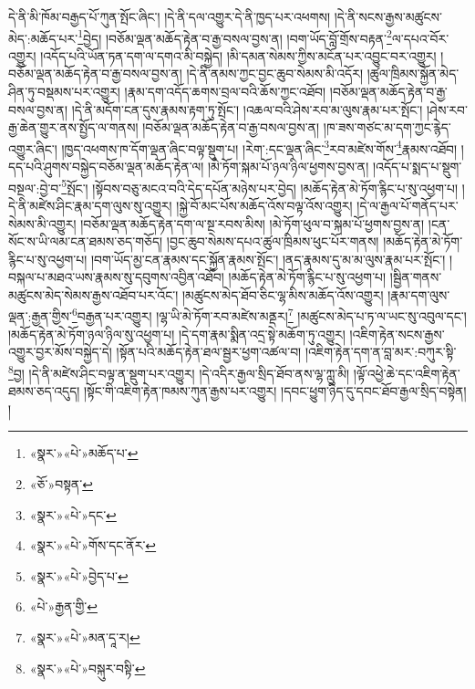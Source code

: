 དེ་ནི་མི་ཁོམ་བརྒྱད་པོ་ཀུན་སྤོང་ཞིང་། །དེ་ནི་དལ་འགྱུར་དེ་ནི་ཁྱད་པར་འཕགས། །དེ་ནི་སངས་རྒྱས་མཚུངས་མེད་:མཆོད་པར་\footnote{«སྣར་»«པེ་»མཆོད་པ་}བྱེད། །བཅོམ་ལྡན་མཆོད་རྟེན་བ་རྒྱ་བསལ་བྱས་ན། །བག་ཡོད་བློ་གྲོས་བརྟན་\footnote{«ཅོ་»བསྟན་}ལ་དཔའ་བོར་འགྱུར། །འདོད་པའི་ཡོན་ཏན་དག་ལ་དགའ་མི་བསྐྱེད། །མི་དམན་སེམས་ཀྱིས་མངོན་པར་འབྱུང་བར་འགྱུར། །བཅོམ་ལྡན་མཆོད་རྟེན་བ་རྒྱ་བསལ་བྱས་ན། །དེ་ནི་ནམས་ཀྱང་བྱང་ཆུབ་སེམས་མི་འདོར། །ཚུལ་ཁྲིམས་སྐྱོན་མེད་ཤིན་ཏུ་བསྡམས་པར་འགྱུར། །རྣམ་དག་འདོད་ཆགས་བྲལ་བའི་ཆོས་ཀྱང་འཐོབ། །བཅོམ་ལྡན་མཆོད་རྟེན་བ་རྒྱ་བསལ་བྱས་ན། །དེ་ནི་མདོག་ངན་དུས་རྣམས་རྟག་ཏུ་སྤོང་། །འཆལ་བའི་ཤེས་རབ་མ་ལུས་རྣམ་པར་སྤོང་། །ཤེས་རབ་རྒྱ་ཆེན་གྱུར་ནས་སྤྱོད་ལ་གནས། །བཅོམ་ལྡན་མཆོད་རྟེན་བ་རྒྱ་བསལ་བྱས་ན། །ཁ་ཟས་གཙང་མ་དག་ཀྱང་རྙེད་འགྱུར་ཞིང་། །ཁྱད་འཕགས་ཁ་དོག་ལྡན་ཞིང་བལྟ་སྡུག་པ། །རེག་:དང་ལྡན་ཞིང་\footnote{«སྣར་»«པེ་»དང་}རབ་མཛེས་གོས་\footnote{«སྣར་»«པེ་»གོས་དང་ནོར་}རྣམས་འཐོབ། །དད་པའི་ཤུགས་བསྐྱེད་བཅོམ་ལྡན་མཆོད་རྟེན་ལ། །མེ་ཏོག་སྐམ་པོ་ཉལ་ཉིལ་ཕྱགས་བྱས་ན། །འདོད་པ་སྨད་པ་སྡུག་བསྔལ་:བྱེ་བ་\footnote{«སྣར་»«པེ་»བྱེད་པ་}སྤོང་། །སྟོབས་བཅུ་མངའ་བའི་དེད་དཔོན་མཉེས་པར་བྱེད། །མཆོད་རྟེན་མེ་ཏོག་རྙིང་པ་སུ་འཕྱག་པ། །དེ་ནི་མཛེས་ཤིང་རྣམ་དག་ལུས་སུ་འགྱུར། །སྐྱེ་བོ་མང་པོས་མཆོད་འོས་བལྟ་འོས་འགྱུར། །དེ་ལ་རྒྱལ་པོ་གནོད་པར་སེམས་མི་འགྱུར། །བཅོམ་ལྡན་མཆོད་རྟེན་དག་ལ་སྔ་རབས་མིས། །མེ་ཏོག་ཕུལ་བ་སྐམ་པོ་ཕྱགས་བྱས་ན། །ངན་སོང་ས་ཡི་ལམ་ངན་ཐམས་ཅད་གཅོད། །བྱང་ཆུབ་སེམས་དཔའ་ཚུལ་ཁྲིམས་ཕུང་པོར་གནས། །མཆོད་རྟེན་མེ་ཏོག་རྙིང་པ་སུ་འཕྱག་པ། །བག་ཡོད་མྱ་ངན་རྣམས་དང་སྐྱོན་རྣམས་སྤོང་། །ནད་རྣམས་དུ་མ་མ་ལུས་རྣམ་པར་སྤོང་། །བསྐལ་པ་མཐའ་ཡས་རྣམས་སུ་དབུགས་འབྱིན་འཐོབ། །མཆོད་རྟེན་མེ་ཏོག་རྙིང་པ་སུ་འཕྱག་པ། །སྦྱིན་གནས་མཚུངས་མེད་སེམས་རྒྱས་འཐོབ་པར་འོང་། །མཚུངས་མེད་ཐོབ་ཅིང་ལྷ་མིས་མཆོད་འོས་འགྱུར། །རྣམ་དག་ལུས་ལྡན་:རྒྱན་གྱིས་\footnote{«པེ་»རྒྱན་གྱི་}བརྒྱན་པར་འགྱུར། །ལྷ་ཡི་མེ་ཏོག་རབ་མཛེས་མནྡར།\footnote{«སྣར་»«པེ་»མན་དཱ་ར།} །མཚུངས་མེད་པ་ཏ་ལ་ཡང་སུ་འབུལ་དང་། །མཆོད་རྟེན་མེ་ཏོག་ཉལ་ཉིལ་སུ་འཕྱག་པ། །དེ་དག་རྣམ་སྨིན་འདྲ་སྟེ་མཆོག་ཏུ་འགྱུར། །འཇིག་རྟེན་སངས་རྒྱས་འགྱུར་བྱར་མོས་བསྐྱེད་དེ། །སྟོན་པའི་མཆོད་རྟེན་ཐལ་སྦྱར་ཕྱག་འཚལ་བ། །འཇིག་རྟེན་དག་ན་བླ་མར་:བཀུར་སྟི་\footnote{«སྣར་»«པེ་»བསྐུར་བསྟི་}བྱ། །དེ་ནི་མཛེས་ཤིང་བལྟ་ན་སྡུག་པར་འགྱུར། །དེ་འདིར་རྒྱལ་སྲིད་ཐོབ་ནས་ལྷ་ཀླུ་མི། །ལྟོ་འཕྱེ་ཆེ་དང་འཇིག་རྟེན་ཐམས་ཅད་འདུད། །སྟོང་གི་འཇིག་རྟེན་ཁམས་ཀུན་རྒྱས་པར་འགྱུར། །དབང་ཕྱུག་ཉིད་དུ་དབང་ཐོབ་རྒྱལ་སྲིད་བསྟེན། །
